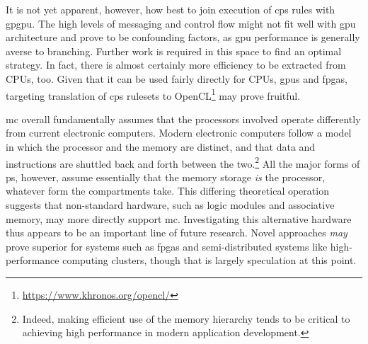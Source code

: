 It is not yet apparent, however, how best to join execution of \gls{cps} rules with \gls{gpgpu}.  The high levels of messaging and control flow might not fit well with \gls{gpu} architecture and prove to be confounding factors, as \gls{gpu} performance is generally averse to branching.  Further work is required in this space to find an optimal strategy.  In fact, there is almost certainly more efficiency to be extracted from CPUs, too.  Given that it can be used fairly directly for CPUs, \glspl{gpu} and \glspl{fpga}, targeting translation of \gls{cps} \glspl{ruleset} to OpenCL\footnote{\url{https://www.khronos.org/opencl/}} may prove fruitful.

\Gls{mc} overall fundamentally assumes that the processors involved operate differently from current electronic computers.  Modern electronic computers follow a model in which the processor and the memory are distinct, and that data and instructions are shuttled back and forth between the two.\footnote{Indeed, making efficient use of the memory hierarchy tends to be critical to achieving high performance in modern application development.}  All the major forms of \gls{ps}, however, assume essentially that the memory storage \emph{is} the processor, whatever form the \glspl{compartment} take.  This differing theoretical operation suggests that non-standard hardware, such as logic modules and associative memory, may more directly support \gls{mc}.  Investigating this alternative hardware thus appears to be an important line of future research.  Novel approaches \emph{may} prove superior for systems such as \glspl{fpga} and semi-distributed systems like high-performance computing clusters, though that is largely speculation at this point.


